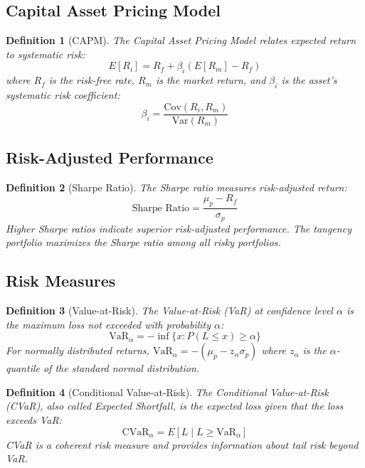 \documentclass[a4paper, 11pt]{article}
\newtheorem{definition}{Definition}[section]
\begin{document}
\subsection{Capital Asset Pricing Model}

\begin{definition}[CAPM]
The Capital Asset Pricing Model relates expected return to systematic risk:
\begin{equation}
E[R_i] = R_f + \beta_i (E[R_m] - R_f)
\end{equation}
where $R_f$ is the risk-free rate, $R_m$ is the market return, and $\beta_i$ is the asset's
systematic risk coefficient:
\begin{equation}
\beta_i = \frac{\text{Cov}(R_i, R_m)}{\text{Var}(R_m)}
\end{equation}
\end{definition}

\subsection{Risk-Adjusted Performance}

\begin{definition}[Sharpe Ratio]
The Sharpe ratio measures risk-adjusted return:
\begin{equation}
\text{Sharpe Ratio} = \frac{\mu_p - R_f}{\sigma_p}
\end{equation}
Higher Sharpe ratios indicate superior risk-adjusted performance. The tangency portfolio
maximizes the Sharpe ratio among all risky portfolios.
\end{definition}

\subsection{Risk Measures}

\begin{definition}[Value-at-Risk]
The Value-at-Risk (VaR) at confidence level $\alpha$ is the maximum loss not exceeded with
probability $\alpha$:
\begin{equation}
\text{VaR}_\alpha = -\inf\{x : P(L \leq x) \geq \alpha\}
\end{equation}
For normally distributed returns, $\text{VaR}_\alpha = -(\mu_p - z_\alpha \sigma_p)$ where
$z_\alpha$ is the $\alpha$-quantile of the standard normal distribution.
\end{definition}

\begin{definition}[Conditional Value-at-Risk]
The Conditional Value-at-Risk (CVaR), also called Expected Shortfall, is the expected loss
given that the loss exceeds VaR:
\begin{equation}
\text{CVaR}_\alpha = E[L \mid L \geq \text{VaR}_\alpha]
\end{equation}
CVaR is a coherent risk measure and provides information about tail risk beyond VaR.
\end{definition}
\end{document}
